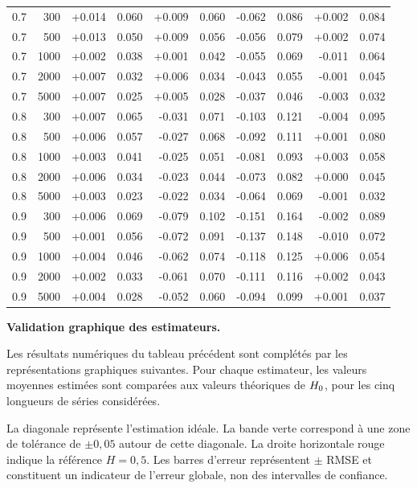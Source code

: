 \begin{longtable}{rrrrrrrrrr}
0.7 & 300  & +0.014 & 0.060 & +0.009 & 0.060 & -0.062 & 0.086 & +0.002 & 0.084 \\
0.7 & 500  & +0.013 & 0.050 & +0.009 & 0.056 & -0.056 & 0.079 & +0.002 & 0.074 \\
0.7 & 1000 & +0.002 & 0.038 & +0.001 & 0.042 & -0.055 & 0.069 & -0.011 & 0.064 \\
0.7 & 2000 & +0.007 & 0.032 & +0.006 & 0.034 & -0.043 & 0.055 & -0.001 & 0.045 \\
0.7 & 5000 & +0.007 & 0.025 & +0.005 & 0.028 & -0.037 & 0.046 & -0.003 & 0.032 \\

0.8 & 300  & +0.007 & 0.065 & -0.031 & 0.071 & -0.103 & 0.121 & -0.004 & 0.095 \\
0.8 & 500  & +0.006 & 0.057 & -0.027 & 0.068 & -0.092 & 0.111 & +0.001 & 0.080 \\
0.8 & 1000 & +0.003 & 0.041 & -0.025 & 0.051 & -0.081 & 0.093 & +0.003 & 0.058 \\
0.8 & 2000 & +0.006 & 0.034 & -0.023 & 0.044 & -0.073 & 0.082 & +0.000 & 0.045 \\
0.8 & 5000 & +0.003 & 0.023 & -0.022 & 0.034 & -0.064 & 0.069 & -0.001 & 0.032 \\

0.9 & 300  & +0.006 & 0.069 & -0.079 & 0.102 & -0.151 & 0.164 & -0.002 & 0.089 \\
0.9 & 500  & +0.001 & 0.056 & -0.072 & 0.091 & -0.137 & 0.148 & -0.010 & 0.072 \\
0.9 & 1000 & +0.004 & 0.046 & -0.062 & 0.074 & -0.118 & 0.125 & +0.006 & 0.054 \\
0.9 & 2000 & +0.002 & 0.033 & -0.061 & 0.070 & -0.111 & 0.116 & +0.002 & 0.043 \\
0.9 & 5000 & +0.004 & 0.028 & -0.052 & 0.060 & -0.094 & 0.099 & +0.001 & 0.037 \\

\end{longtable}

\medskip
\noindent
\textbf{Validation graphique des estimateurs.}

Les résultats numériques du tableau précédent sont complétés
par les représentations graphiques suivantes. Pour chaque
estimateur, les valeurs moyennes estimées sont comparées aux
valeurs théoriques de $H_0$, pour les cinq longueurs de
séries considérées.

La diagonale représente l'estimation idéale. La bande verte
correspond à une zone de tolérance de $\pm 0{,}05$ autour de
cette diagonale. La droite horizontale rouge indique la
référence $H=0{,}5$. Les barres d'erreur représentent
$\pm$ RMSE et constituent un indicateur de l'erreur globale,
non des intervalles de confiance.

